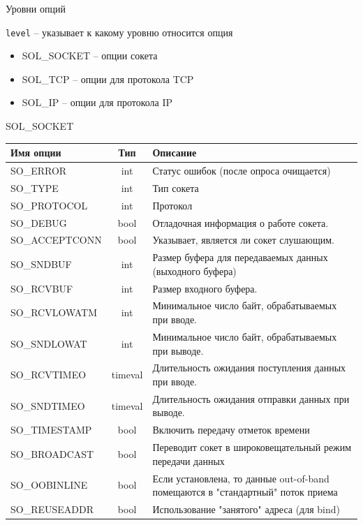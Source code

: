 \begin{frame}{Уровни опций}

	{\tt level} -- указывает к какому уровню относится опция

	\begin{itemize}
		\item SOL\_SOCKET -- опции сокета
		\item SOL\_TCP -- опции для протокола TCP
		\item SOL\_IP -- опции для протокола IP
	\end{itemize}
\end{frame}

\begin{frame}{SOL\_SOCKET}

\scriptsize
	\begin{table}[ht]
	\centering
	\begin{tabular}[c]{l|c|l}
Имя опции & Тип & Описание \\
	\hline
SO\_ERROR & int & Статус ошибок (после опроса очищается)\\
SO\_TYPE & int & Тип сокета\\
SO\_PROTOCOL & int & Протокол \\
SO\_DEBUG & bool & Отладочная информация о работе сокета.\\
SO\_ACCEPTCONN & bool & Указывает,  является ли сокет слушающим. \\
SO\_SNDBUF & int & Размер буфера для передаваемых данных (выходного буфера)\\
SO\_RCVBUF & int & Размер входного буфера. \\
SO\_RCVLOWATM & int & Минимальное число байт,  обрабатываемых при вводе.\\
SO\_SNDLOWAT & int & Минимальное число байт,  обрабатываемых при выводе. \\
SO\_RCVTIMEO & timeval & Длительность ожидания поступления данных при вводе.\\
SO\_SNDTIMEO & timeval & Длительность ожидания отправки данных при выводе. \\
SO\_TIMESTAMP & bool & Включить передачу отметок времени \\
SO\_BROADCAST & bool & Переводит сокет в широковещательный режим передачи данных\\
SO\_OOBINLINE & bool & Если установлена, то данные out-of-band помещаются в "стандартный" поток приема\\
SO\_REUSEADDR & bool & Использование "занятого" адреса (для bind)\\
\end{tabular}
	\end{table}
\normalsize

\end{frame}

